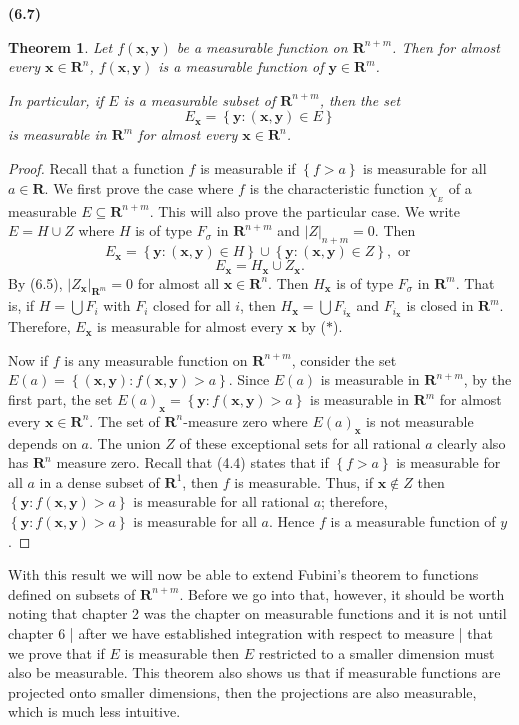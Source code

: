 \documentclass[12pt]{book}
\renewcommand{\vec}[1]{\mathbf{#1}}
\newcommand{\st}{\bf{:}}
\newcommand{\set}[1]{\left\{ #1 \right\}}
\renewcommand{\u}{\cup}
\newcommand{\bu}{\bigcup}
\renewcommand{\ss}{\subseteq}
\newcommand{\ind}[1]{\chi_{_{#1}}}
\newcommand{\x}{\mathbf{x}}
\newcommand{\R}{\mathbf{R}}
\newcommand{\tor}{\text{ or }}
\renewcommand{\.}{\mkern1mu}
\newcounter{case}
\newcommand{\abs}[1]{\left| #1 \right|}
\newenvironment{pf}{\begin{proof}\setlength{\parindent}{\normalparindent}\setlength{\parskip}{\normalparskip}}{\end{proof}}
\theoremstyle{theorem}
\newtheorem{theorem}{Theorem}
\newcommand{\thmindent}{\setlength{\parindent}{17pt}}
\newenvironment{thm}[1]
	{\noindent \textbf{#1}\hspace{2ex}\begin{minipage}[t]{\linewidth - \widthof{\textbf{(#1)}}}  \begin{theorem}\thmindent }
	{\end{theorem}\end{minipage}\medskip}
\renewcommand{\bf}[1]{\boldsymbol{#1}}
\newlength{\normalparindent}
\newlength{\normalparskip}
\begin{document}
	\begin{thm}{(6.7)}
		Let $f(\vec x, \vec y)$ be a measurable function on $\R^{n+m}$. Then for almost every $\vec x \in \R^n$, $f(\vec x, \vec y)$ is a measurable function of $\vec y \in \R^m$.
		
		In particular, if $E$ is a measurable subset of $\R^{n+m}$, then the set 
			\[
				E_\vec x = \set{\vec y \st (\vec x, \vec y) \in E}
			\]
		is measurable in $\R^m$ for almost every $\vec x \in \R^n$.
	\end{thm}
	\begin{pf}
		Recall that a function $f$ is measurable if $\set{f > a}$ is measurable for all $a\in\R$. We first prove the case where $f$ is the characteristic function $\ind E$ of a measurable $E\ss  \R^{n+m}$. This will also prove the particular case. We write $E = H\u Z$ where $H$ is of type $F_\sigma$ in $\R^{n+m}$ and $\abs{Z}_{n+m} = 0$. Then
			\[
				E_\vec x = \set{\vec y \st (\vec x, \vec y) \in H} \u \set{\vec y \st (\vec x, \vec y)\in Z}, \tor 
			\]
			\begin{equation*}
				E_\vec x = H_\vec x \u Z_\vec x. 
			\tag{$*$}
			\end{equation*}
		By (6.5), $\abs{Z_\vec x}_{\R^m} = 0$ for almost all $\vec x\in \R^n$. Then $H_\x$ is of type $F_\sigma$ in $\R^m$. That is, if $H = \bu F_i$ with $F_i$ closed for all $i$, then $H_\vec x = \bu F_{i_\vec x}$ and $F_{i_\vec x}$ is closed in $\R^m$. Therefore, $E_\vec x$ is measurable for almost every $\vec x$ by ($*$).
		
		Now if $f$ is any measurable function on $\R^{n+m}$, consider the set $E(a) = \set{(\vec x, \vec y): f(\vec x, \vec y) > a}$. Since $E(a)$ is measurable in $\R^{n+m}$, by the first part, the set $E(a)_\vec x = \set{\vec y \st f(\vec x, \vec y) > a}$ is measurable in $\R^m$ for almost every $\vec x \in \R^n$. The set of $\R^n$-measure zero where $E(a)_\vec x$ is not measurable depends on $a$. The union $Z$ of these exceptional sets for all rational $a$ clearly also has $\R^n$ measure zero. Recall that (4.4)  states that if $\set{f > a}$ is measurable for all $a$ in a dense subset of $\R^1$, then $f$ is measurable. Thus, if $\vec x \notin Z$ then $\set{\vec y \st f(\vec x, \vec y) > a}$ is measurable for all rational $a$; therefore, $\set{\vec y \st f(\vec x, \vec y) > a}$ is measurable for all $a$. Hence $f$ is a measurable function of $y$. 
	\end{pf}
	
	With this result we will now be able to extend Fubini's theorem to functions defined on subsets of $\R^{n+m}$. Before we go into that, however, it should be worth noting that chapter 2 was the chapter on measurable functions and it is not until chapter 6 | after we have established integration with respect to measure | that we prove that if $E$ is measurable then $E$ restricted to a smaller dimension must also be measurable. This theorem also shows us that if measurable functions are projected onto smaller dimensions, then the projections are also measurable, which is much less intuitive.
	
\end{document}
